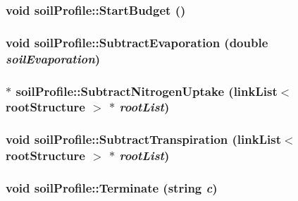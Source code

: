 \hypertarget{classsoil_profile_ac0825115659eefb3cdf0d25bc385b594}{
\subsubsection[{StartBudget}]{\setlength{\rightskip}{0pt plus 5cm}void soilProfile::StartBudget ()}}
\label{classsoil_profile_ac0825115659eefb3cdf0d25bc385b594}
\hypertarget{classsoil_profile_a4edb42ee540e88473200024afd61b232}{
\subsubsection[{SubtractEvaporation}]{\setlength{\rightskip}{0pt plus 5cm}void soilProfile::SubtractEvaporation (double {\em soilEvaporation})}}
\label{classsoil_profile_a4edb42ee540e88473200024afd61b232}
\hypertarget{classsoil_profile_af357c8e8608de267646daf715ca1a125}{
\subsubsection[{SubtractNitrogenUptake}]{ $\ast$ soilProfile::SubtractNitrogenUptake ({\bf linkList}$<$ {\bf rootStructure} $>$ $\ast$ {\em rootList})}}
\label{classsoil_profile_af357c8e8608de267646daf715ca1a125}
\hypertarget{classsoil_profile_a276eab1d6e61326093e214a89a9af7db}{
\subsubsection[{SubtractTranspiration}]{\setlength{\rightskip}{0pt plus 5cm}void soilProfile::SubtractTranspiration ({\bf linkList}$<$ {\bf rootStructure} $>$ $\ast$ {\em rootList})}}
\label{classsoil_profile_a276eab1d6e61326093e214a89a9af7db}
\hypertarget{classsoil_profile_a63e938ce16657be6fbff5eb6a6b63791}{
\subsubsection[{Terminate}]{\setlength{\rightskip}{0pt plus 5cm}void soilProfile::Terminate (string {\em c})}}
